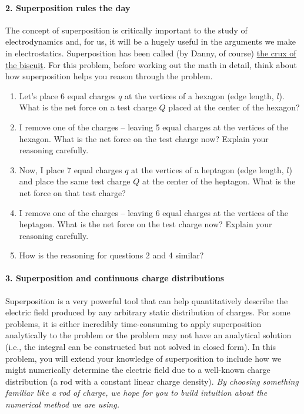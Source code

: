 \documentclass[11pt]{article}
\def\tightlist{}
\begin{document}
\paragraph{2. Superposition rules the
day}\label{superposition-rules-the-day}

The concept of superposition is critically important to the study of
electrodynamics and, for us, it will be a hugely useful in the arguments
we make in electrostatics. Superposition has been called (by Danny, of
course)
\href{https://www.youtube.com/playlist?list=PL8WvZFiJpAr3cZlCr0Gag8BV3-mGdcUBM}{the
crux of the biscuit}. For this problem, before working out the math in
detail, think about how superposition helps you reason through the
problem.

\begin{enumerate}
\def\labelenumi{\arabic{enumi}.}
\tightlist
\item
  Let's place 6 equal charges \(q\) at the vertices of a hexagon (edge
  length, \(l\)). What is the net force on a test charge \(Q\) placed at
  the center of the hexagon?
\item
  I remove one of the charges -- leaving 5 equal charges at the vertices
  of the hexagon. What is the net force on the test charge now? Explain
  your reasoning carefully.
\item
  Now, I place 7 equal charges \(q\) at the vertices of a heptagon (edge
  length, \(l\)) and place the same test charge \(Q\) at the center of
  the heptagon. What is the net force on that test charge?
\item
  I remove one of the charges -- leaving 6 equal charges at the vertices
  of the heptagon. What is the net force on the test charge now? Explain
  your reasoning carefully.
\item
  How is the reasoning for questions 2 and 4 similar?
\end{enumerate}

\paragraph{3. Superposition and continuous charge
distributions}\label{superposition-and-continuous-charge-distributions}

Superposition is a very powerful tool that can help quantitatively
describe the electric field produced by any arbitrary static
distribution of charges. For some problems, it is either incredibly
time-consuming to apply superposition analytically to the problem or the
problem may not have an analytical solution (i.e., the integral can be
constructed but not solved in closed form). In this problem, you will
extend your knowledge of superposition to include how we might
numerically determine the electric field due to a well-known charge
distribution (a rod with a constant linear charge density). \emph{By
choosing something familiar like a rod of charge, we hope for you to
build intuition about the numerical method we are using.}
\end{document}
